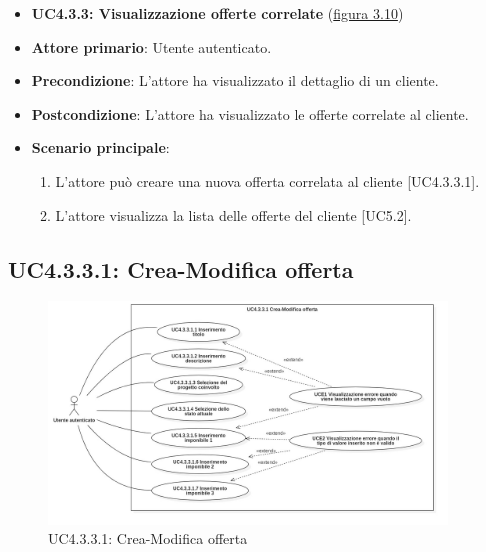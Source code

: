 \begin{itemize}
\item \textbf{UC4.3.3: Visualizzazione offerte correlate} ({\hyperref[fig:UC4.3.3]{figura 3.10}})
\item \textbf{Attore primario}: Utente autenticato.
\item \textbf{Precondizione}: L'attore ha visualizzato il dettaglio di un cliente.
\item \textbf{Postcondizione}: L'attore ha visualizzato le offerte correlate al cliente.
\item \textbf{Scenario principale}:
\begin{enumerate}
\item L'attore può creare una nuova offerta correlata al cliente [UC4.3.3.1].
\item L'attore visualizza la lista delle offerte del cliente [UC5.2].
\end{enumerate}
\end{itemize}

\pagebreak

\subsection{UC4.3.3.1: Crea-Modifica offerta}
\begin{figure}[!h]
\centering
\includegraphics[width=400px]{../images/UC/.jpeg/UC4.3.3.1-nuovaModificaOfferta.jpg}
\caption{UC4.3.3.1: Crea-Modifica offerta}
\label{fig:UC4.3.3.1}
\end{figure}


